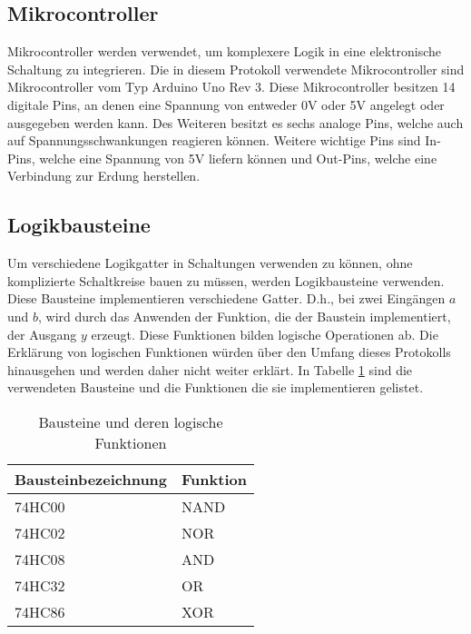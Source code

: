 \subsection{Mikrocontroller \cite{arduino-r3}}
\label{subsec:mikrocontroller}

Mikrocontroller werden verwendet, um komplexere Logik in eine elektronische Schaltung zu integrieren.
Die in diesem Protokoll verwendete Mikrocontroller sind Mikrocontroller vom Typ Arduino Uno Rev 3.
Diese Mikrocontroller besitzen 14 digitale Pins, an denen eine Spannung von entweder 0V oder 5V angelegt oder ausgegeben werden kann.
Des Weiteren besitzt es sechs analoge Pins, welche auch auf Spannungsschwankungen reagieren können.
Weitere wichtige Pins sind In-Pins, welche eine Spannung von 5V liefern können und Out-Pins, welche eine Verbindung zur Erdung herstellen.

\subsection{Logikbausteine}
\label{subsec:logikbausteine}

Um verschiedene Logikgatter in Schaltungen verwenden zu können, ohne komplizierte Schaltkreise bauen zu müssen, werden Logikbausteine verwenden.
Diese Bausteine implementieren verschiedene Gatter.
D.h., bei zwei Eingängen $a$ und $b$, wird durch das Anwenden der Funktion, die der Baustein implementiert,  der Ausgang $y$ erzeugt.
Diese Funktionen bilden logische Operationen ab.
Die Erklärung von logischen Funktionen würden über den Umfang dieses Protokolls hinausgehen und werden daher nicht weiter erklärt.
In Tabelle \ref{tab:bausteine-und-deren-logische-funktionen} sind die verwendeten Bausteine und die Funktionen die sie implementieren gelistet.

\begin{table}[ht]
    \centering
    \caption{Bausteine und deren logische Funktionen}
    \label{tab:bausteine-und-deren-logische-funktionen}
    \begin{tabular}{| l | l |}
        \hline
        Bausteinbezeichnung & Funktion \\
        \hline
        74HC00 & NAND \\
        74HC02 & NOR \\
        74HC08 & AND \\
        74HC32 & OR \\
        74HC86 & XOR \\
        \hline
    \end{tabular}
\end{table}

